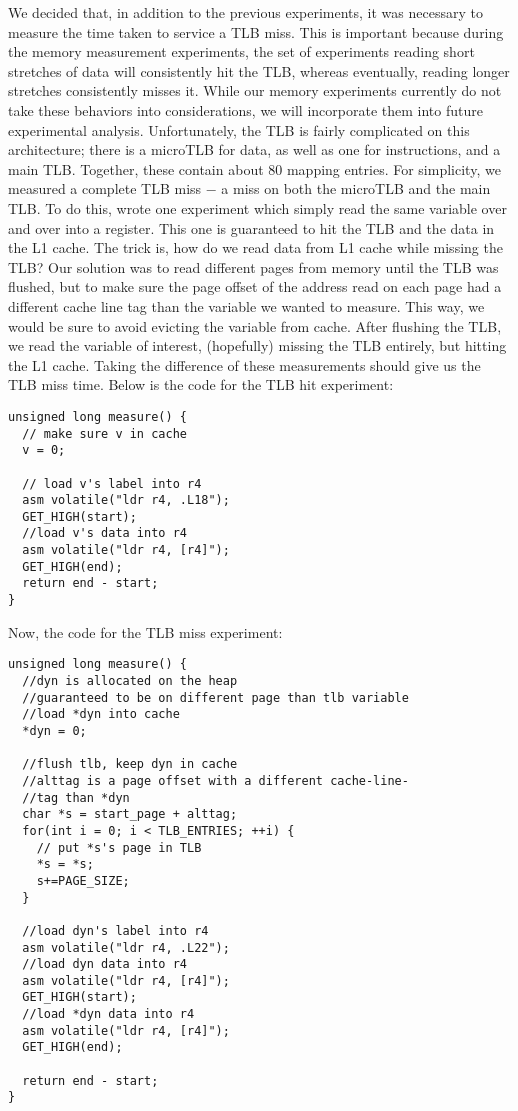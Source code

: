 We decided that, in addition to the previous experiments, it was necessary to measure the time taken to service a TLB miss. This is important because during the memory measurement experiments, the set of experiments reading short stretches of data will consistently hit the TLB, whereas eventually, reading longer stretches consistently misses it. While our memory experiments currently do not take these behaviors into considerations, we will incorporate them into future experimental analysis.
\newline
\newline
Unfortunately, the TLB is fairly complicated on this architecture; there is a microTLB for data, as well as one for instructions, and a main TLB. Together, these contain about 80 mapping entries. For simplicity, we measured a complete TLB miss $-$ a miss on both the microTLB and the main TLB.
\newline
\newline
To do this, wrote one experiment which simply read the same variable over and over into a register. This one is guaranteed to hit the TLB and the data in the L1 cache. The trick is, how do we read data from L1 cache while missing the TLB? Our solution was to read different pages from memory until the TLB was flushed, but to make sure the page offset of the address read on each page had a different cache line tag than the variable we wanted to measure. This way, we would be sure to avoid evicting the variable from cache. After flushing the TLB, we read the variable of interest, (hopefully) missing the TLB entirely, but hitting the L1 cache. Taking the difference of these measurements should give us the TLB miss time.
\newline
\newline
Below is the code for the TLB hit experiment:
\begin{verbatim}
unsigned long measure() {
  // make sure v in cache
  v = 0;

  // load v's label into r4
  asm volatile("ldr r4, .L18");
  GET_HIGH(start);
  //load v's data into r4
  asm volatile("ldr r4, [r4]");
  GET_HIGH(end);
  return end - start;
}
\end{verbatim}

\newpage

\noindent Now, the code for the TLB miss experiment:
\begin{verbatim}
unsigned long measure() {
  //dyn is allocated on the heap
  //guaranteed to be on different page than tlb variable
  //load *dyn into cache
  *dyn = 0;

  //flush tlb, keep dyn in cache
  //alttag is a page offset with a different cache-line-
  //tag than *dyn
  char *s = start_page + alttag;
  for(int i = 0; i < TLB_ENTRIES; ++i) {
    // put *s's page in TLB
    *s = *s;
    s+=PAGE_SIZE;
  }

  //load dyn's label into r4
  asm volatile("ldr r4, .L22");
  //load dyn data into r4
  asm volatile("ldr r4, [r4]");
  GET_HIGH(start);
  //load *dyn data into r4
  asm volatile("ldr r4, [r4]");
  GET_HIGH(end);

  return end - start;
}
\end{verbatim}

